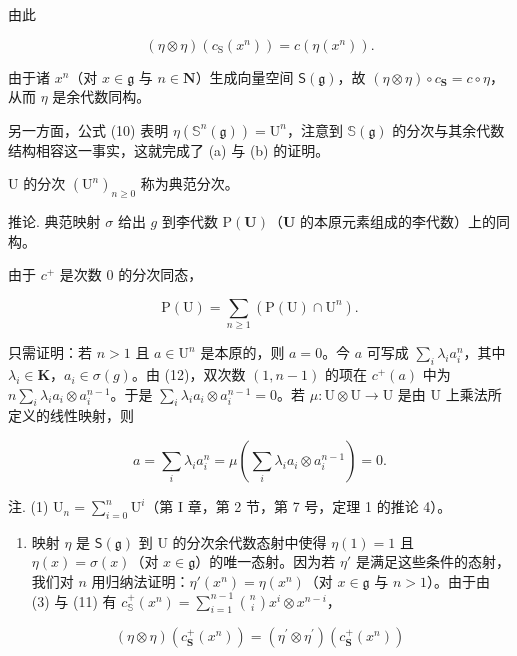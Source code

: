 由此

\[
(\eta \otimes \eta) (c _ {\mathrm{S}} (x ^ {n})) = c (\eta (x ^ {n})).
\]

由于诸 \(x^n\)（对 \(x \in \mathfrak{g}\) 与 \(n \in \mathbf{N}\)）生成向量空间 \(\mathsf{S}(\mathfrak{g})\)，故 \((\eta \otimes \eta) \circ c_{\mathbf{S}} = c \circ \eta\)，从而 \(\eta\) 是余代数同构。

另一方面，公式 (10) 表明 \(\eta(\mathbb{S}^n(\mathfrak{g})) = \mathrm{U}^n\)，注意到 \(\mathbb{S}(\mathfrak{g})\) 的分次与其余代数结构相容这一事实，这就完成了 (a) 与 (b) 的证明。

U 的分次 \((\mathrm{U}^{n})_{n\geqslant0}\) 称为典范分次。

推论. 典范映射 \(\sigma\) 给出 \(g\) 到李代数 \(\mathrm{P}(\mathbf{U})\)（\(\mathbf{U}\) 的本原元素组成的李代数）上的同构。

由于 \(c^{+}\) 是次数 0 的分次同态，

\[
\mathrm{P} (\mathrm{U}) = \sum_ {n \geqslant 1} (\mathrm{P} (\mathrm{U}) \cap \mathrm{U} ^ {n}).
\]

只需证明：若 \(n > 1\) 且 \(a \in \mathrm{U}^n\) 是本原的，则 \(a = 0\)。今 \(a\) 可写成 \(\sum_{i} \lambda_i a_i^n\)，其中 \(\lambda_i \in \mathbf{K}\)，\(a_i \in \sigma(g)\)。由 (12)，双次数 \((1, n - 1)\) 的项在 \(c^+(a)\) 中为 \(n \sum_{i} \lambda_i a_i \otimes a_i^{n-1}\)。于是 \(\sum_{i} \lambda_i a_i \otimes a_i^{n-1} = 0\)。若 \(\mu: \mathrm{U} \otimes \mathrm{U} \to \mathrm{U}\) 是由 \(\mathrm{U}\) 上乘法所定义的线性映射，则

\[
a = \sum_ {i} \lambda_ {i} a _ {i} ^ {n} = \mu \left(\sum_ {i} \lambda_ {i} a _ {i} \otimes a _ {i} ^ {n - 1}\right) = 0.
\]

注. (1) \(\mathrm{U}_n = \sum_{i=0}^{n} \mathrm{U}^i\)（第 I 章，第 2 节，第 7 号，定理 1 的推论 4）。

\begin{enumerate}
\def\labelenumi{(\arabic{enumi})}
\setcounter{enumi}{1}
\tightlist
\item
  映射 \(\eta\) 是 \(\mathsf{S}(\mathfrak{g})\) 到 U 的分次余代数态射中使得 \(\eta(1) = 1\) 且 \(\eta(x) = \sigma(x)\)（对 \(x \in \mathfrak{g}\)）的唯一态射。因为若 \(\eta'\) 是满足这些条件的态射，我们对 \(n\) 用归纳法证明：\(\eta'(x^n) = \eta(x^n)\)（对 \(x \in \mathfrak{g}\) 与 \(n > 1\)）。由于由 (3) 与 (11) 有 \(c_{\mathbb{S}}^{+}(x^{n}) = \sum_{i=1}^{n-1} \binom{n}{i} x^{i} \otimes x^{n-i}\)，
\end{enumerate}

\[
(\eta \otimes \eta) (c _ {\mathbf {S}} ^ {+} (x ^ {n})) = (\eta^ {\prime} \otimes \eta^ {\prime}) (c _ {\mathbf {S}} ^ {+} (x ^ {n}))
\]

